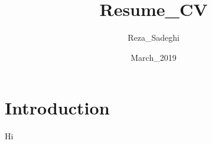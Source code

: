 \documentclass{article}
\title{Resume_CV}
\author{Reza_Sadeghi}
\date{March_2019}
\begin{document}
\section{Introduction}
Hi
\end{document}
